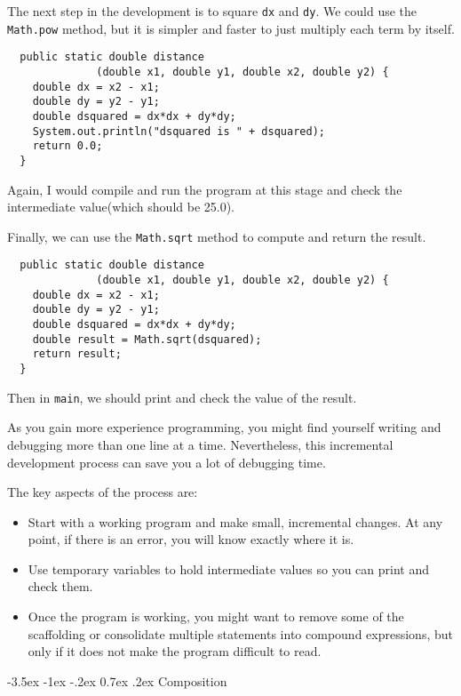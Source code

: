 \documentclass{book}
\makeatletter
\renewcommand{\section}{\@startsection 
    {section} {1} {0mm}%
    {-3.5ex \@plus -1ex \@minus -.2ex}%
    {0.7ex \@plus.2ex}%
    {\normalfont\Large\bfseries}}
\makeatother
\begin{document}
The next step in the development is to square {\tt dx} and {\tt dy}.
We could use the {\tt Math.pow} method, but it is simpler and
faster to just multiply each term by itself.

\begin{verbatim}
  public static double distance
              (double x1, double y1, double x2, double y2) {
    double dx = x2 - x1;
    double dy = y2 - y1;
    double dsquared = dx*dx + dy*dy;
    System.out.println("dsquared is " + dsquared);
    return 0.0;
  }
\end{verbatim}
%
Again, I would compile and run the program at this stage
and check the intermediate value(which should be 25.0).

Finally, we can use the {\tt Math.sqrt} method to compute and
return the result.

\begin{verbatim}
  public static double distance
              (double x1, double y1, double x2, double y2) {
    double dx = x2 - x1;
    double dy = y2 - y1;
    double dsquared = dx*dx + dy*dy;
    double result = Math.sqrt(dsquared);
    return result;
  }
\end{verbatim}
%
Then in {\tt main}, we should print and check the value of the result.

As you gain more experience programming, you might find yourself
writing and debugging more than one line at a time.  Nevertheless,
this incremental development process can save you a lot of
debugging time.

The key aspects of the process are:

\begin{itemize}

\item Start with a working program and make small, incremental
changes.  At any point, if there is an error, you will know
exactly where it is.

\item Use temporary variables to hold intermediate values so
you can print and check them.

\item Once the program is working, you might want to remove
some of the scaffolding or consolidate multiple statements into
compound expressions, but only if it does not make the program
difficult to read.

\end{itemize}

\section{Composition}
\end{document}
